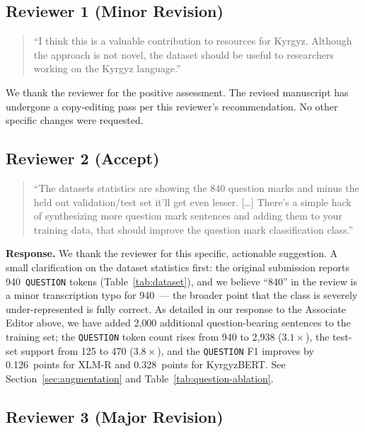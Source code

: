 \documentclass[manuscript, review]{acmart}
\begin{document}
\subsection*{Reviewer 1 (Minor Revision)}

\begin{quote}
``I think this is a valuable contribution to resources for Kyrgyz. Although the approach is not novel, the dataset should be useful to researchers working on the Kyrgyz language.''
\end{quote}

\noindent We thank the reviewer for the positive assessment. The revised manuscript has undergone a copy-editing pass per this reviewer's recommendation. No other specific changes were requested.

\subsection*{Reviewer 2 (Accept)}

\begin{quote}
``The datasets statistics are showing the 840 question marks and minus the held out validation/test set it'll get even lesser. [\ldots] There's a simple hack of synthesizing more question mark sentences and adding them to your training data, that should improve the question mark classification class.''
\end{quote}

\noindent\textbf{Response.} We thank the reviewer for this specific, actionable suggestion. A small clarification on the dataset statistics first: the original submission reports 940~\texttt{QUESTION} tokens (Table~\ref{tab:dataset}), and we believe ``840'' in the review is a minor transcription typo for 940~--- the broader point that the class is severely under-represented is fully correct. As detailed in our response to the Associate Editor above, we have added 2{,}000 additional question-bearing sentences to the training set; the \texttt{QUESTION} token count rises from 940 to 2{,}938 ($3.1\times$), the test-set support from 125 to 470 ($3.8\times$), and the \texttt{QUESTION} F1 improves by 0.126~points for XLM-R and 0.328~points for KyrgyzBERT. See Section~\ref{sec:augmentation} and Table~\ref{tab:question-ablation}.

\subsection*{Reviewer 3 (Major Revision)}
\end{document}
